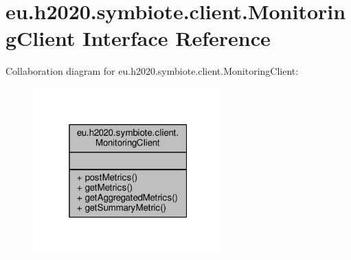 \hypertarget{interfaceeu_1_1h2020_1_1symbiote_1_1client_1_1MonitoringClient}{}\section{eu.\+h2020.\+symbiote.\+client.\+Monitoring\+Client Interface Reference}
\label{interfaceeu_1_1h2020_1_1symbiote_1_1client_1_1MonitoringClient}


Collaboration diagram for eu.\+h2020.\+symbiote.\+client.\+Monitoring\+Client\+:\nopagebreak
\begin{figure}[H]
\begin{center}
\leavevmode
\includegraphics[width=208pt]{interfaceeu_1_1h2020_1_1symbiote_1_1client_1_1MonitoringClient__coll__graph}
\end{center}
\end{figure}
